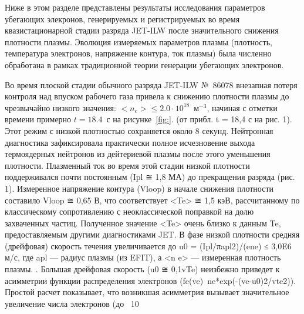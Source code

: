 Ниже в этом разделе представлены результаты исследования параметров убегающих элекронов, генерируемых и регистрируемых во время квазистационарной стадии разряда JET-ILW после значительного снижения плотности плазмы. Эволюция измеряемых параметров плазмы (плотность, температура электронов, напряжение контура, ток плазмы) была численно обработана в рамках традиционной теории генерации убегающих электронов.~\cite{Plyusnin2015}

Во время плоской стадии обычного разряда JET-ILW №~86078 внезапная потеря контроля над впуском рабочего газа привела к снижению плотности плазмы до чрезвычайно низкого значения: $ < n_e > \le 2.0\cdot10^{18}$~м${}^{-3}$, начиная с отметки времени примерно $t = 18.4$~с на рисунке~\ref{fig:}. (от прибл. t = 18,4 с на рис. 1). Этот режим с низкой плотностью сохраняется около 8 секунд. Нейтронная диагностика зафиксировала практически полное исчезновение выхода термоядерных нейтронов из дейтериевой плазмы после этого уменьшения плотности. Плазменный ток во время этой стадии низкой плотности поддерживался почти постоянным (Ipl ≅ 1,8 МА) до прекращения разряда (рис. 1). Измеренное напряжение контура (Vloop) в начале снижения плотности составило Vloop ≅ 0,65 В, что соответствует <Te> ≅ 1,5 кэВ, рассчитанному по классическому сопротивлению с неоклассической поправкой на долю захваченных частиц. Полученное значение <Te> очень близко к данным Te, предоставляемым другими диагностиками JET. В фазе низкой плотности средняя (дрейфовая) скорость течения увеличивается до u0 = (Ipl/πapl2)/(ene) ≤ 3,0E6 м/с, где apl — радиус плазмы (из EFIT), а <n e> — измеренная плотность плазмы. . Большая дрейфовая скорость (u0 ≅ 0,1vTe) неизбежно приведет к асимметрии функции распределения электронов (fe(ve)~ne*exp(-(ve-u0)2/vte2)). Простой расчет показывает, что возникшая асимметрия вызывает значительное увеличение числа электронов (до ~10%



\clearpage
